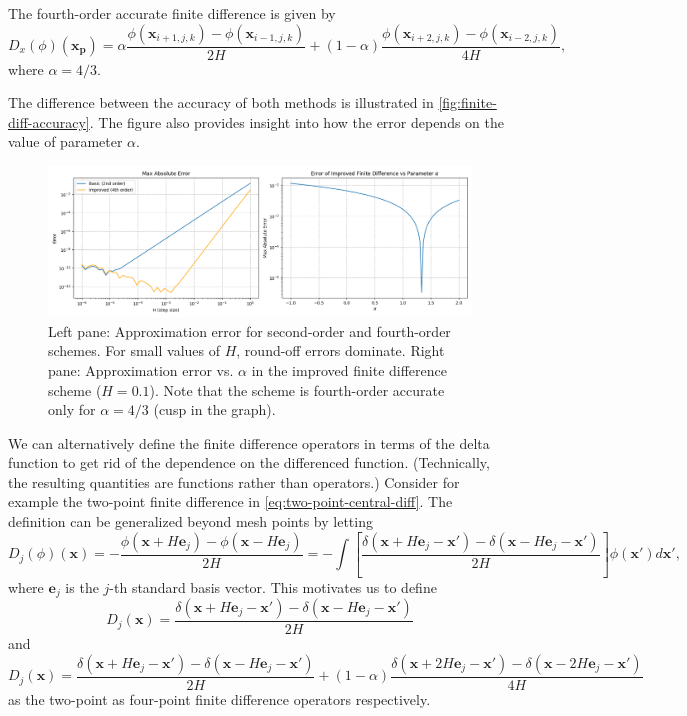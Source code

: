 The fourth-order accurate finite difference is given by
\begin{equation*}
    D_x(\phi)(\mathbf{x}_\mathbf{p}) = \alpha\frac{\phi(\mathbf{x}_{i+1,j,k}) - \phi(\mathbf{x}_{i-1,j,k})}{2H} + (1-\alpha)\frac{\phi(\mathbf{x}_{i+2,j,k}) - \phi(\mathbf{x}_{i-2,j,k})}{4H},
\end{equation*}
where $\alpha = 4/3$.

The difference between the accuracy of both methods is illustrated in \autoref{fig:finite-diff-accuracy}.
The figure also provides insight into how the error depends on the value of parameter $\alpha$.
\begin{figure}[htp]
    \centering
    \includegraphics[scale=0.43]{img/finite-diff/finite-difference.png}
    \caption{Left pane: Approximation error for second-order and fourth-order schemes.
        For small values of $H$, round-off errors dominate.
        Right pane: Approximation error vs. $\alpha$ in the improved finite difference scheme ($H = 0.1$).
        Note that the scheme is fourth-order accurate only for $\alpha = 4/3$ (cusp in the graph).}
    \label{fig:finite-diff-accuracy}
\end{figure}

We can alternatively define the finite difference operators in terms of the delta function to get rid of the dependence on the differenced function. (Technically, the resulting quantities are functions rather than operators.)
Consider for example the two-point finite difference in \autoref{eq:two-point-central-diff}.
The definition can be generalized beyond mesh points by letting
\begin{equation*}
    D_j(\phi)(\mathbf{x}) = -\frac{\phi(\mathbf{x} + H \mathbf{e}_j)-\phi (\mathbf{x} - H \mathbf{e}_j)}{2H} = -\int \left[ \frac{\delta(\mathbf{x} + H\mathbf{e}_j - \mathbf{x}') - \delta(\mathbf{x} - H\mathbf{e}_j - \mathbf{x}')}{2H} \right]\phi(\mathbf{x}')d\mathbf{x}',
\end{equation*}
where $\mathbf{e}_j$ is the $j$-th standard basis vector.
This motivates us to define
\begin{equation}\label{eq:two-point-central-diff}
    D_j(\mathbf{x}) = \frac{\delta(\mathbf{x} + H\mathbf{e}_j - \mathbf{x}') - \delta(\mathbf{x} - H\mathbf{e}_j - \mathbf{x}')}{2H}
\end{equation}
and
\begin{equation}\label{eq:four-point-central-diff}
    D_j(\mathbf{x}) = \frac{\delta(\mathbf{x} + H\mathbf{e}_j - \mathbf{x}') - \delta(\mathbf{x} - H\mathbf{e}_j - \mathbf{x}')}{2H} + (1-\alpha)\frac{\delta(\mathbf{x} + 2H\mathbf{e}_j - \mathbf{x}') - \delta(\mathbf{x} - 2H\mathbf{e}_j - \mathbf{x}')}{4H}
\end{equation}
as the two-point as four-point finite difference operators respectively.

